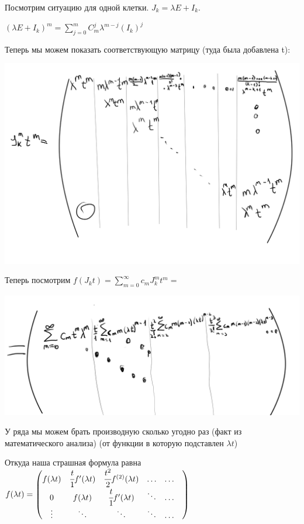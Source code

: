 Посмотрим ситуацию для одной клетки. $J_k = \lambda E + I_k$.

$(\lambda E + I_k)^m = \sum\limits_{j=0}^m C_m^j \lambda^{m-j} (I_k)^j  $ %

Теперь мы можем показать соответствующую матрицу (туда была добавлена t):
\begin{center}
 \includegraphics[width = 15cm]{assets/7_10-function.png}    
\end{center}
Теперь посмотрим $f(J_kt)=\sum\limits_{m=0}^{\infty}c_m J_k^mt^m = $
\begin{center}
 \includegraphics[width = 15cm]{assets/7_10-limit-function.png}    
\end{center}
У ряда мы можем брать производную сколько угодно раз (факт из математического анализа) (от функции в которую подставлен $\lambda t$)

Откуда наша страшная формула равна $f(\lambda t) = \begin{pmatrix}
    f(\lambda t) & \cfrac{t}{1}f'(\lambda t) & \cfrac{t^2}{2}f^{(2)}(\lambda t) & \ldots & \ldots & \\
    0 & f(\lambda t) & \cfrac{t}{1}f'(\lambda t) &\ddots &\ldots 
    \\
    \vdots & \ddots & \ddots & \ddots& \ldots
\end{pmatrix}$


